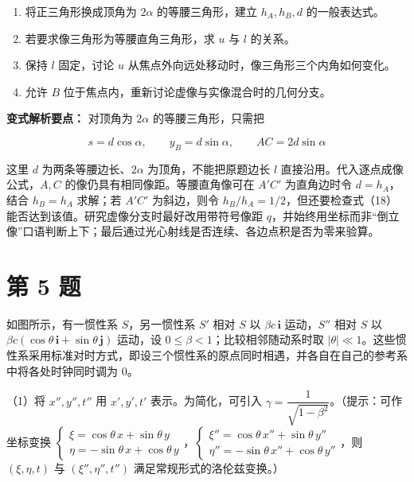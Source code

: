 \documentclass[12pt,a4paper,UTF8]{ctexart}
\newcommand{\tightlist}{\setlength{\itemsep}{0pt}\setlength{\parskip}{0pt}}
\begin{document}
\begin{enumerate}
\def\labelenumi{\arabic{enumi}.}
\tightlist
\item
  将正三角形换成顶角为 \(2\alpha\) 的等腰三角形，建立 \(h_A,h_B,d\)
  的一般表达式。
\item
  若要求像三角形为等腰直角三角形，求 \(u\) 与 \(l\) 的关系。
\item
  保持 \(l\) 固定，讨论 \(u\)
  从焦点外向远处移动时，像三角形三个内角如何变化。
\item
  允许 \(B\) 位于焦点内，重新讨论虚像与实像混合时的几何分支。
\end{enumerate}

\textbf{变式解析要点：} 对顶角为 \(2\alpha\) 的等腰三角形，只需把

\[
s=d\cos\alpha,\qquad y_B=d\sin\alpha,\qquad AC=2d\sin\alpha
\]

这里 \(d\) 为两条等腰边长、\(2\alpha\) 为顶角，不能把原题边长 \(l\)
直接沿用。代入逐点成像公式，\(A,C\) 的像仍具有相同像距。等腰直角像可在
\(A'C'\) 为直角边时令 \(d=h_A\)，结合 \(h_B=h_A\) 求解；若 \(A'C'\)
为斜边，则令
\(h_B/h_A=1/2\)，但还要检查式（18）能否达到该值。研究虚像分支时最好改用带符号像距
\(q\)，并始终用坐标而非``倒立像''口语判断上下；最后通过光心射线是否连续、各边点积是否为零来验算。

\newpage

\section{第 5 题}\label{ux7b2c-5-ux9898}

如图所示，有一惯性系 \(S\)，另一惯性系 \(S'\) 相对 \(S\) 以
\(\beta c\,\bm i\) 运动，\(S''\) 相对 \(S\) 以
\(\beta c(\cos\theta\,\bm i+\sin\theta\,\bm j)\) 运动，设
\(0\le\beta<1\)；比较相邻随动系时取
\(|\theta|\ll1\)。这些惯性系采用标准对时方式，即设三个惯性系的原点同时相遇，并各自在自己的参考系中将各处时钟同时调为
\(0\)。

（1）将 \(x'',y'',t''\) 用 \(x',y',t'\) 表示。为简化，可引入
\(\gamma=\dfrac1{\sqrt{1-\beta^2}}\)。（提示：可作坐标变换
\(\begin{cases}\xi=\cos\theta\,x+\sin\theta\,y\\ \eta=-\sin\theta\,x+\cos\theta\,y\end{cases}\)，\(\begin{cases}\xi''=\cos\theta\,x''+\sin\theta\,y''\\ \eta''=-\sin\theta\,x''+\cos\theta\,y''\end{cases}\)，则
\((\xi,\eta,t)\) 与 \((\xi'',\eta'',t'')\) 满足常规形式的洛伦兹变换。）
\end{document}
